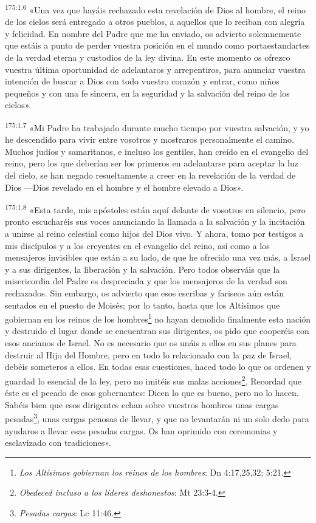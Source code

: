 \par
\textsuperscript{175:1.6} «Una vez que hayáis rechazado esta revelación de Dios al hombre, el reino de los cielos será entregado a otros pueblos, a aquellos que lo reciban con alegría y felicidad. En nombre del Padre que me ha enviado, os advierto solemnemente que estáis a punto de perder vuestra posición en el mundo como portaestandartes de la verdad eterna y custodios de la ley divina. En este momento os ofrezco vuestra última oportunidad de adelantaros y arrepentiros, para anunciar vuestra intención de buscar a Dios con todo vuestro corazón y entrar, como niños pequeños y con una fe sincera, en la seguridad y la salvación del reino de los cielos».

\par
\textsuperscript{175:1.7} «Mi Padre ha trabajado durante mucho tiempo por vuestra salvación, y yo he descendido para vivir entre vosotros y mostraros personalmente el camino. Muchos judíos y samaritanos, e incluso los gentiles, han creído en el evangelio del reino, pero los que deberían ser los primeros en adelantarse para aceptar la luz del cielo, se han negado resueltamente a creer en la revelación de la verdad de Dios ---Dios revelado en el hombre y el hombre elevado a Dios».

\par
\textsuperscript{175:1.8} «Esta tarde, mis apóstoles están aquí delante de vosotros en silencio, pero pronto escucharéis sus voces anunciando la llamada a la salvación y la incitación a unirse al reino celestial como hijos del Dios vivo. Y ahora, tomo por testigos a mis discípulos y a los creyentes en el evangelio del reino, así como a los mensajeros invisibles que están a su lado, de que he ofrecido una vez más, a Israel y a sus dirigentes, la liberación y la salvación. Pero todos observáis que la misericordia del Padre es despreciada y que los mensajeros de la verdad son rechazados. Sin embargo, os advierto que esos escribas y fariseos aún están sentados en el puesto de Moisés; por lo tanto, hasta que los Altísimos que gobiernan en los reinos de los hombres\footnote{\textit{Los Altísimos gobiernan los reinos de los hombres}: Dn 4:17,25,32; 5:21.} no hayan demolido finalmente esta nación y destruido el lugar donde se encuentran sus dirigentes, os pido que cooperéis con esos ancianos de Israel. No es necesario que os unáis a ellos en sus planes para destruir al Hijo del Hombre, pero en todo lo relacionado con la paz de Israel, debéis someteros a ellos. En todas esas cuestiones, haced todo lo que os ordenen y guardad lo esencial de la ley, pero no imitéis sus malas acciones\footnote{\textit{Obedeced incluso a los líderes deshonestos}: Mt 23:3-4.}. Recordad que éste es el pecado de esos gobernantes: Dicen lo que es bueno, pero no lo hacen. Sabéis bien que esos dirigentes echan sobre vuestros hombros unas cargas pesadas\footnote{\textit{Pesadas cargas}: Lc 11:46.}, unas cargas penosas de llevar, y que no levantarán ni un solo dedo para ayudaros a llevar esas pesadas cargas. Os han oprimido con ceremonias y esclavizado con tradiciones».

